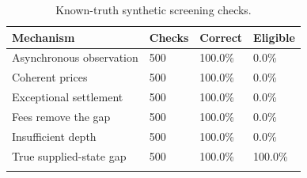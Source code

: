 \begin{table}[htbp]\centering
{\fontsize{10}{12}\selectfont\renewcommand{\arraystretch}{1.18}\setlength{\tabcolsep}{4pt}
\begin{tabularx}{\linewidth}{@{}L{82mm}C{24mm}C{27mm}X@{}}\toprule{}
\textbf{Mechanism} & \textbf{Checks} & \textbf{Correct} & \textbf{Eligible} \\ \midrule
Asynchronous observation & 500 & 100.0\% & 0.0\% \\ \hline
Coherent prices & 500 & 100.0\% & 0.0\% \\ \hline
Exceptional settlement & 500 & 100.0\% & 0.0\% \\ \hline
Fees remove the gap & 500 & 100.0\% & 0.0\% \\ \hline
Insufficient depth & 500 & 100.0\% & 0.0\% \\ \hline
True supplied-state gap & 500 & 100.0\% & 100.0\% \\ \hline
{}\bottomrule\end{tabularx}}
\caption[Known-truth synthetic screening checks]{Known-truth synthetic screening checks.}\label{tab:synthetic}
\end{table}

